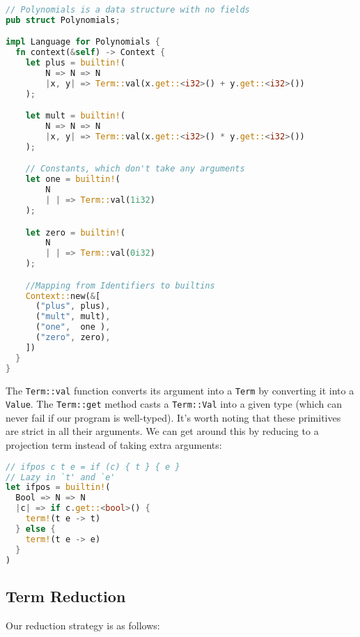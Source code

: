 \begin{lstlisting}[language=rust]
// Polynomials is a data structure with no fields
pub struct Polynomials;

impl Language for Polynomials {
  fn context(&self) -> Context {
    let plus = builtin!(
        N => N => N 
        |x, y| => Term::val(x.get::<i32>() + y.get::<i32>())
    );

    let mult = builtin!(
        N => N => N
        |x, y| => Term::val(x.get::<i32>() * y.get::<i32>())
    );

    // Constants, which don't take any arguments
    let one = builtin!(
        N
        | | => Term::val(1i32)
    );

    let zero = builtin!(
        N
        | | => Term::val(0i32)
    );

    //Mapping from Identifiers to builtins
    Context::new(&[
      ("plus", plus),
      ("mult", mult),
      ("one",  one ),
      ("zero", zero),
    ])
  }
}
\end{lstlisting}

The \texttt{Term::val} function converts its argument into a \texttt{Term} by converting it into a \texttt{Value}. The \texttt{Term::get} method casts a \texttt{Term::Val} into a given type (which can never fail if our program is well-typed). It's worth noting that these primitives are strict in all their arguments. We can get around this by reducing to a projection term instead of taking extra arguments:

\begin{lstlisting}[language=rust]
// ifpos c t e = if (c) { t } { e }
// Lazy in `t' and `e' 
let ifpos = builtin!(
  Bool => N => N 
  |c| => if c.get::<bool>() {
    term!(t e -> t)
  } else {
    term!(t e -> e)
  }
)
\end{lstlisting}

\subsection{Term Reduction}

Our reduction strategy is as follows: 
